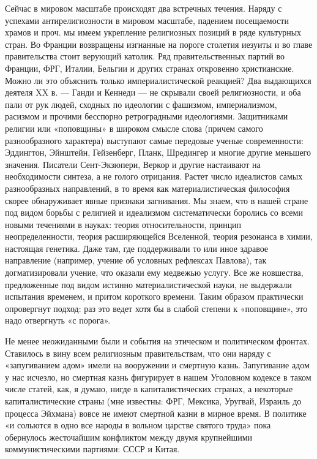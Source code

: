 Сейчас в мировом  масштабе происходят два встречных  течения. Наряду с
успехами антирелигиозности  в мировом масштабе,  падением посещаемости
храмов  и  проч.  мы  имеем  укрепление  религиозных  позиций  в  ряде
культурных стран.  Во Франции возвращены изгнанные  на пороге столетия
иезуиты  и   во  главе  правительства  стоит   верующий  католик.  Ряд
правительственных  партий во  Франции, ФРГ,  Италии, Бельгии  и других
странах  откровенно  христианские.  Можно   ли  это  объяснить  только
империалистической реакцией? Два выдающихся деятеля  XX в. --- Ганди и
Кеннеди  ---  не скрывали  своей  религиозности,  и  оба пали  от  рук
людей,  сходных по  идеологии  с фашизмом,  империализмом, расизмом  и
прочими бесспорно  ретроградными идеологиями. Защитниками  религии или
«поповщины»  в  широком  смысле слова  (причем  самого  разнообразного
характера) выступают самые  передовые ученые современности: Эддингтон,
Эйнштейн,  Гейзенберг,  Планк,  Шредингер  и  многие  другие  меньшего
значения.  Писатели  Сент-Экзюпери,  Веркор  и  другие  настаивают  на
необходимости синтеза, а не  голого отрицания. Растет число идеалистов
самых  разнообразных направлений,  в то  время как  материалистическая
философия скорее обнаруживает явные признаки загнивания. Мы знаем, что
в нашей стране под видом борьбы с религией и идеализмом систематически
боролись со  всеми новыми течениями в  науках: теория относительности,
принцип  неопределенности,  теория   расширяющейся  Вселенной,  теория
резонанса в химии,  настоящая генетика. Даже там,  где поддерживали то
или иное  здравое направление (например, учение  об условных рефлексах
Павлова), так догматизировали учение, что оказали ему медвежью услугу.
Все же  новшества, предложенные  под видом  истинно материалистической
науки, не  выдержали испытания  временем, и притом  короткого времени.
Таким образом практически опровергнут подход:  раз это ведет хотя бы в
слабой степени к «поповщине», это надо отвергнуть «с порога».

Не  менее неожиданными  были  и события  на  этическом и  политическом
фронтах.  Ставилось в  вину всем  религиозным правительствам,  что они
наряду с  «запугиванием адом»  имели на  вооружении и  смертную казнь.
Запугивание адом у  нас исчезло, но смертная казнь  фигурирует в нашем
Уголовном  кодексе  в  таком  числе  статей, как,  я  думаю,  нигде  в
капиталистических странах,  а некоторые капиталистические  страны (мне
известны: ФРГ, Мексика, Уругвай, Израиль до процесса Эйхмана) вовсе не
имеют смертной казни в мирное время. В политике «и сольются в одно все
народы в  вольном царстве  святого труда» пока  обернулось жесточайшим
конфликтом между двумя крупнейшими  коммунистическими партиями: СССР и
Китая.

